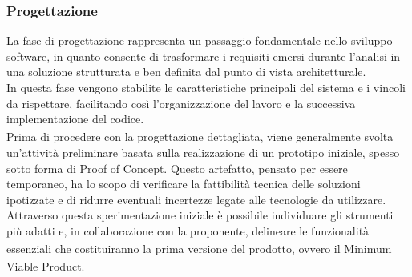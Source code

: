 \documentclass[a4paper,11pt]{article}
\newcommand{\G}{\textsubscript{\scalebox{0.6}{\textbf{G}}}}
\begin{document}
\subsubsection{Progettazione}
La fase di progettazione rappresenta un passaggio fondamentale nello sviluppo software, in quanto consente di trasformare i 
requisiti emersi durante l'analisi in una soluzione strutturata e ben definita dal punto di vista architetturale. \\
In questa fase vengono stabilite le caratteristiche principali del sistema e i vincoli da rispettare, facilitando così 
l'organizzazione del lavoro e la successiva implementazione\G{} del codice.\\
Prima di procedere con la progettazione dettagliata, viene generalmente svolta un'attività preliminare basata sulla realizzazione 
di un prototipo iniziale, spesso sotto forma di Proof of Concept. Questo artefatto, pensato per essere temporaneo, ha lo scopo di 
verificare la fattibilità tecnica delle soluzioni ipotizzate e di ridurre eventuali incertezze legate alle tecnologie da utilizzare.\\
Attraverso questa sperimentazione iniziale è possibile individuare gli strumenti più adatti e, in collaborazione con la proponente\G{}, 
delineare le funzionalità\G{} essenziali che costituiranno la prima versione del prodotto\G{}, ovvero il Minimum Viable Product\G{}.
\end{document}
